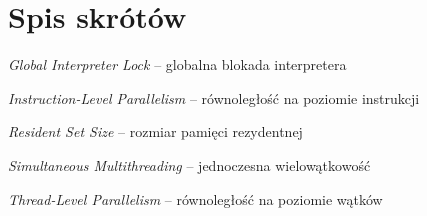 \cleardoublepage

\chapter*{Spis skrótów}

\begin{description}[leftmargin=3cm, style=multiline]
    \item[GIL] \textit{Global Interpreter Lock} -- globalna blokada interpretera
    \item[ILP] \textit{Instruction-Level Parallelism} -- równoległość na poziomie instrukcji
    \item[RSS] \textit{Resident Set Size} -- rozmiar pamięci rezydentnej
    \item[SMT] \textit{Simultaneous Multithreading} -- jednoczesna wielowątkowość
    \item[TLP] \textit{Thread-Level Parallelism} -- równoległość na poziomie wątków   
\end{description}